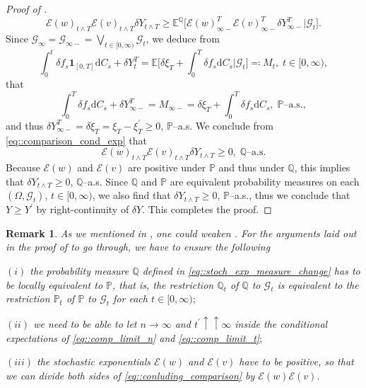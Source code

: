 \documentclass[10pt]{article} %
\newtheorem{remark}[theorem]{Remark}
\newcommand\cE{\mathcal E}
\newcommand\cG{\mathcal G}
\def \E{\mathbb{E}}
\def \P{\mathbb{P}}
\def \Q{\mathbb{Q}}
\newcommand{\1}{\mathbf{1}}
\def\d{\mathrm{d}}
\begin{document}
\begin{proof}[Proof of ]
	\begin{equation}\label{eq::comparison_cond_exp}
		\cE(w)_{t \land T}\cE(v)_{t \land T}\delta Y_{t \land T} \geq \E^\Q\bigg[ \cE(w)^T_{\infty-}\cE(v)^T_{\infty-}\delta Y^T_{\infty-} \bigg| \cG_t\bigg].
	\end{equation}
	Since $\cG_{\infty} = \cG_{\infty-} = \bigvee_{t \in [0,\infty)} \cG_t$, we deduce from
	\begin{equation*}
		\int_0^t \delta f_s \mathbf{1}_{[0,T]} \d C_s + \delta Y^T_t = \E \bigg[\delta \xi_T + \int_0^T \delta f_s \d C_s \bigg| \cG_t\bigg] \eqqcolon M_t, \; t \in [0,\infty),
	\end{equation*}
	that 
	\begin{equation*}
		\int_0^T \delta f_s \d C_s + \delta Y^T_{\infty-} = M_{\infty-} = \delta \xi_T + \int_0^T \delta f_s \d C_s, \;\text{$\P$--a.s.},
	\end{equation*}
	and thus $\delta Y^T_{\infty-} = \delta\xi_T = \xi_T - \xi^\prime_T \geq 0$, $\P$--a.s. We conclude from \eqref{eq::comparison_cond_exp} that 
	\begin{equation}\label{eq::conluding_comparison}
		\cE(w)_{t \land T}\cE(v)_{t \land T}\delta Y_{t \land T} \geq 0, \; \text{$\Q$--a.s.}
	\end{equation}
	Because $\cE(w)$ and $\cE(v)$ are positive under $\P$ and thus under $\Q$, this implies that $\delta Y_{t \land T} \geq 0$, $\Q$--a.s. Since $\Q$ and $\P$ are equivalent probability measures on each $(\Omega,\cG_t)$, $t \in [0,\infty)$, we also find that $\delta Y_{t \land T} \geq 0$, $\P$--a.s., thus we conclude that $Y \geq Y^\prime$ by right-continuity of $\delta Y$. This completes the proof.
	\endgroup
\end{proof}

\begin{remark}\label{rem::comparison_proof}
	As we mentioned in {\rm{}}, one could weaken {\rm{}}. For the arguments laid out in the proof of {\rm{}} to go through, we have to ensure the following
	
	\medskip
	$(i)$ the probability measure $\Q$ defined in \eqref{eq::stoch_exp_measure_change} has to be locally equivalent to $\P$, that is, the restriction $\Q_t$ of $\Q$ to $\cG_t$ is equivalent to the restriction $\P_t$ of $\P$ to $\cG_t$ for each $t \in [0,\infty);$
	
	\medskip
	$(ii)$ we need to be able to let $n \rightarrow \infty$ and $t^\prime \uparrow\uparrow \infty$ inside the conditional expectations of \eqref{eq::comp_limit_n} and \eqref{eq::comp_limit_t}$;$
	
	\medskip
	$(iii)$ the stochastic exponentials $\cE(w)$ and $\cE(v)$ have to be positive, so that we can divide both sides of \eqref{eq::conluding_comparison} by $\cE(w)\cE(v)$.
\end{remark}
\end{document}
